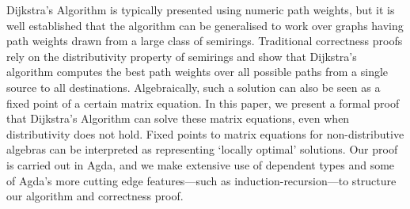 Dijkstra's Algorithm is typically presented using numeric path weights, but it is well established that the algorithm can be generalised to work over graphs having path weights drawn from a large class of semirings.
Traditional correctness proofs rely on the distributivity property of semirings and show that Dijkstra's algorithm computes the best path weights over all possible paths from a single source to all destinations.
Algebraically, such a solution can also be seen as a fixed point of a certain matrix equation.
In this paper, we present a formal proof that Dijkstra's Algorithm can solve these matrix equations, even when distributivity does not hold.
Fixed points to matrix equations for non-distributive algebras can be interpreted as representing `locally optimal' solutions.
Our proof is carried out in Agda, and we make extensive use of dependent types and some of Agda's more cutting edge features---such as induction-recursion---to structure our algorithm and correctness proof.

